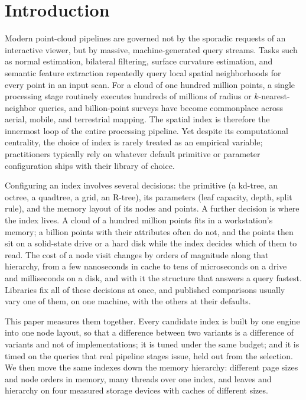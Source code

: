 \section{Introduction}\label{sec:introduction}

Modern point-cloud pipelines are governed not by the sporadic requests of an interactive viewer, but by massive, machine-generated query streams. Tasks such as normal estimation, bilateral filtering, surface curvature estimation, and semantic feature extraction repeatedly query local spatial neighborhoods for every point in an input scan. For a cloud of one hundred million points, a single processing stage routinely executes hundreds of millions of radius or $k$-nearest-neighbor queries, and billion-point surveys have become commonplace across aerial, mobile, and terrestrial mapping. The spatial index is therefore the innermost loop of the entire processing pipeline. Yet despite its computational centrality, the choice of index is rarely treated as an empirical variable; practitioners typically rely on whatever default primitive or parameter configuration ships with their library of choice.

Configuring an index involves several decisions: the primitive (a kd-tree, an octree, a quadtree, a grid, an R-tree), its parameters (leaf capacity, depth, split rule), and the memory layout of its nodes and points. A further decision is where the index lives. A cloud of a hundred million points fits in a workstation's memory; a billion points with their attributes often do not, and the points then sit on a solid-state drive or a hard disk while the index decides which of them to read. The cost of a node visit changes by orders of magnitude along that hierarchy, from a few nanoseconds in cache to tens of microseconds on a drive and milliseconds on a disk, and with it the structure that answers a query fastest. Libraries fix all of these decisions at once, and published comparisons usually vary one of them, on one machine, with the others at their defaults.

This paper measures them together. Every candidate index is built by one engine into one node layout, so that a difference between two variants is a difference of variants and not of implementations; it is tuned under the same budget; and it is timed on the queries that real pipeline stages issue, held out from the selection. We then move the same indexes down the memory hierarchy: different page sizes and node orders in memory, many threads over one index, and leaves and hierarchy on four measured storage devices with caches of different sizes.

